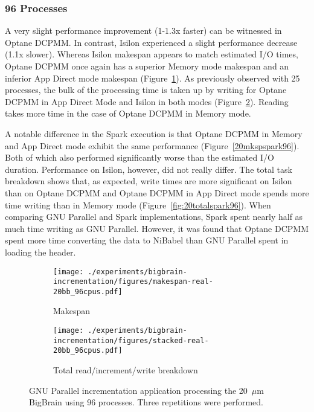 \documentclass[conference]{IEEEtran}
\begin{document}
\subsubsection{96 Processes}

A very slight performance improvement (1-1.3x faster) can be witnessed in Optane DCPMM. In 
contrast, Isilon 
experienced a slight performance decrease (1.1x slower). Whereas Isilon makespan appears to match
estimated I/O times, Optane DCPMM once again has a superior Memory mode makespan and an inferior App Direct
mode makespan (Figure~\ref{fig:20mksp96}). As previously observed with 25 processes,
the bulk of the processing time is taken up by writing for Optane DCPMM in App Direct Mode and 
Isilon in both modes (Figure~\ref{fig:20total96}). Reading takes more time in the case of Optane DCPMM 
in Memory mode. 


A notable difference in the Spark execution is that Optane DCPMM in Memory and App Direct mode
exhibit the same performance (Figure~\ref{20mkspspark96}). Both of which also performed
significantly worse than the estimated I/O duration. Performance on Isilon, however, did
not really differ. The total task breakdown shows that, as expected, write times are more
significant on Isilon than on Optane DCPMM and Optane DCPMM in App Direct mode spends more time writing
than in Memory mode (Figure~\ref{fig:20totalspark96}). When comparing GNU Parallel and 
Spark implementations, Spark spent nearly half as much time writing as GNU Parallel. However,
it was found that Optane DCPMM spent more time converting the data to NiBabel than GNU Parallel spent
in loading the header.

\begin{figure*}
    \begin{subfigure}{\columnwidth}
        \centering
    \texttt{[image: ./experiments/bigbrain-incrementation/figures/makespan-real-20bb\_96cpus.pdf]}
    \caption{Makespan}\label{fig:20mksp96}
\end{subfigure}
\begin{subfigure}{\columnwidth}
        \centering
    \texttt{[image: ./experiments/bigbrain-incrementation/figures/stacked-real-20bb\_96cpus.pdf]}
    \caption{Total read/increment/write breakdown}\label{fig:20total96}
\end{subfigure}
\caption{GNU Parallel incrementation application processing the 20~$\mu$m BigBrain using
96 processes. Three repetitions were performed.}\label{fig:2096}
\end{figure*}
\end{document}
